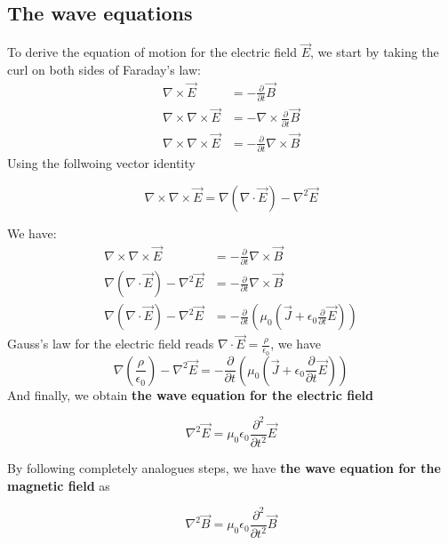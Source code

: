 \subsection{The wave equations}
To derive the equation of motion for the electric field $\overrightarrow{E}$, we start by taking the curl on both sides of Faraday's law:
$$
\begin{aligned}
\nabla \times \vec{E} &=-\frac{\partial}{\partial t} \vec{B} \\
\nabla \times \nabla \times \vec{E} &=-\nabla \times \frac{\partial}{\partial t} \vec{B} \\
\nabla \times \nabla \times \vec{E} &=-\frac{\partial}{\partial t} \nabla \times \vec{B}
\end{aligned}
$$
Using the follwoing vector identity
\begin{qt}
\begin{equation}
\nabla \times \nabla \times \vec{E}=\nabla(\nabla \cdot \vec{E})-\nabla^{2} \vec{E}
\end{equation}
\end{qt}
We have:
$$
\begin{aligned}
\nabla \times \nabla \times \vec{E} &=-\frac{\partial}{\partial t} \nabla \times \vec{B} \\
\nabla(\nabla \cdot \vec{E})-\nabla^{2} \vec{E} &=-\frac{\partial}{\partial t} \nabla \times \vec{B} \\
\nabla(\nabla \cdot \vec{E})-\nabla^{2} \vec{E} &=-\frac{\partial}{\partial t}\left(\mu_{0}\left(\vec{J}+\epsilon_{0} \frac{\partial}{\partial t} \vec{E}\right)\right)
\end{aligned}
$$
Gauss's law for the electric field reads $\nabla \cdot \vec{E}=\frac{\rho}{\epsilon_{0}}$, we have
$$
\nabla\left(\frac{\rho}{\epsilon_{0}}\right)-\nabla^{2} \vec{E}=-\frac{\partial}{\partial t}\left(\mu_{0}\left(\vec{J}+\epsilon_{0} \frac{\partial}{\partial t} \vec{E}\right)\right)
$$
And finally, we obtain \textbf{the wave equation for the electric field}
\begin{qt}
\begin{equation}
\nabla^{2} \vec{E}=\mu_{0} \epsilon_{0} \frac{\partial^{2}}{\partial t^{2}} \vec{E}
\end{equation}
\end{qt}
By following completely analogues steps, we have
\textbf{the wave equation for the magnetic field} as
\begin{qt}
\begin{equation}
\nabla^{2} \vec{B}=\mu_{0} \epsilon_{0} \frac{\partial^{2}}{\partial t^{2}} \vec{B}
\end{equation}
\end{qt}

